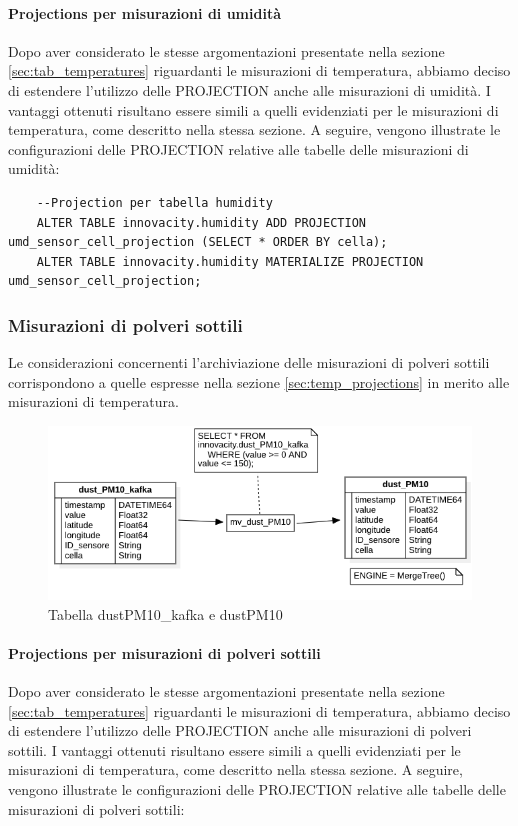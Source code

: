 \paragraph{Projections per misurazioni di umidità} 
Dopo aver considerato le stesse argomentazioni presentate nella sezione \ref{sec:tab_temperatures} riguardanti le misurazioni di temperatura, abbiamo deciso di estendere l'utilizzo delle PROJECTION anche alle misurazioni di umidità. I vantaggi ottenuti risultano essere simili a quelli evidenziati per le misurazioni di temperatura, come descritto nella stessa sezione. A seguire, vengono illustrate le configurazioni delle PROJECTION relative alle tabelle delle misurazioni di umidità:

\begin{lstlisting}
    --Projection per tabella humidity
    ALTER TABLE innovacity.humidity ADD PROJECTION umd_sensor_cell_projection (SELECT * ORDER BY cella);
    ALTER TABLE innovacity.humidity MATERIALIZE PROJECTION umd_sensor_cell_projection;
\end{lstlisting}


\subsubsection{Misurazioni di polveri sottili}Le considerazioni concernenti l'archiviazione delle misurazioni di polveri sottili corrispondono a quelle espresse nella sezione \ref{sec:temp_projections} in merito alle misurazioni di temperatura.

\begin{figure}[H]
    \centering
    \includegraphics[width=1\textwidth]{../Images/SpecificaTecnica/dust_PM10.png}
    \caption{Tabella dustPM10\_kafka e dustPM10}
    \label{fig:dust_table}
  \end{figure}

\paragraph{Projections per misurazioni di polveri sottili} 
Dopo aver considerato le stesse argomentazioni presentate nella sezione \ref{sec:tab_temperatures} riguardanti le misurazioni di temperatura, abbiamo deciso di estendere l'utilizzo delle PROJECTION anche alle misurazioni di polveri sottili. I vantaggi ottenuti risultano essere simili a quelli evidenziati per le misurazioni di temperatura, come descritto nella stessa sezione. A seguire, vengono illustrate le configurazioni delle PROJECTION relative alle tabelle delle misurazioni di polveri sottili:

